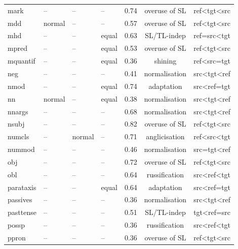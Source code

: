 \begin{longtable}{l|p{2cm}p{2cm}p{1.5cm}ccc}
	mark          & -- & -- & --       & 0.74    & overuse of SL  & ref\textless{}tgt\textless{}src \\
	mdd           & normal       & -- & --       & 0.57    & overuse of SL  & ref\textless{}tgt\textless{}src \\
	mhd           & -- & -- & equal    & 0.63    & SL/TL-indep    & ref=src\textless{}tgt           \\
	mpred         & -- & -- & equal    & 0.53    & overuse of SL  & ref\textless{}tgt\textless{}src \\
	mquantif      & -- & -- & equal    & 0.36    & shining        & ref\textless{}src=tgt           \\
	neg           & -- & -- & --       & 0.41    & normalisation  & src\textless{}tgt\textless{}ref \\
	nmod          & -- & -- & equal    & 0.74    & adaptation     & src\textless{}ref=tgt        \\
	nn            & normal       & -- & equal    & 0.38    & normalisation  & src\textless{}tgt\textless{}ref \\
	nnargs        & -- & -- & --       & 0.68    & normalisation  & src\textless{}tgt\textless{}ref \\
	nsubj         & -- & -- & --       & 0.82    & overuse of SL  & ref\textless{}tgt\textless{}src \\
	numcls        & -- & normal       & --       & 0.71    & anglicisation  & ref\textless{}src\textless{}tgt \\
	nummod        & -- & -- & --       & 0.46    & normalisation        & src=tgt\textless{}ref           \\
	obj           & -- & -- & --       & 0.72    & overuse of SL  & ref\textless{}tgt\textless{}src \\
	obl           & -- & -- & --       & 0.64    & russification  & src\textless{}ref\textless{}tgt \\
	parataxis     & -- & -- & equal    & 0.64    & adaptation     & src\textless{}ref=tgt        \\
	passives      & -- & -- & --       & 0.36    & normalisation  & src\textless{}tgt\textless{}ref \\
	pasttense     & -- & -- & --       & 0.51    & SL/TL-indep    & tgt\textless{}ref=src           \\
	possp         & -- & -- & --       & 0.36    & russification  & src\textless{}ref\textless{}tgt \\
	ppron         & -- & -- & --       & 0.36    & overuse of SL  & ref\textless{}tgt\textless{}src \\

\end{longtable}
